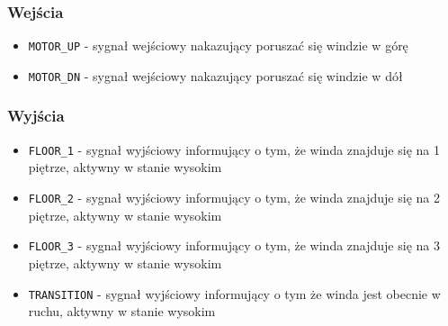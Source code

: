 \documentclass[a4paper]{article}
\begin{document}
\subsubsection{Wejścia}
\begin{itemize}
    \item \verb|MOTOR_UP| - sygnał wejściowy nakazujący poruszać się windzie w górę
    \item \verb|MOTOR_DN| - sygnał wejściowy nakazujący poruszać się windzie w dół
\end{itemize}
\subsubsection{Wyjścia}
\begin{itemize}
    \item \verb|FLOOR_1| - sygnał wyjściowy informujący o tym, że winda znajduje się na 1 piętrze,
                            aktywny w stanie wysokim
    \item \verb|FLOOR_2| - sygnał wyjściowy informujący o tym, że winda znajduje się na 2 piętrze,
                            aktywny w stanie wysokim
    \item \verb|FLOOR_3| - sygnał wyjściowy informujący o tym, że winda znajduje się na 3 piętrze,
                            aktywny w stanie wysokim
    \item \verb|TRANSITION| - sygnał wyjściowy informujący o tym że winda jest obecnie w ruchu,
                            aktywny w stanie wysokim
\end{itemize}
\end{document}
